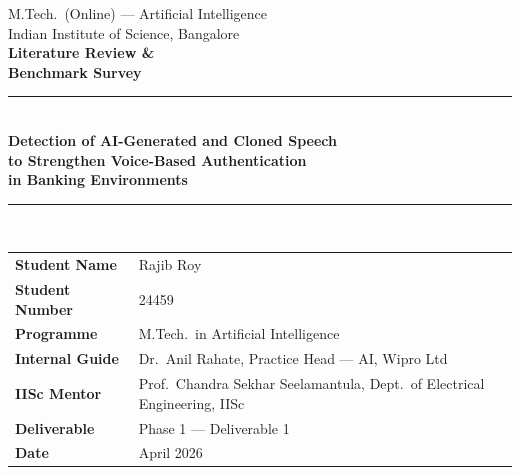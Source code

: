 \documentclass[12pt,a4paper]{article}
\begin{document}

\begin{titlepage}
  \thispagestyle{empty}
  \begin{center}
    \vspace*{1cm}
    {\large\color{darkblue}M.Tech.\ (Online) --- Artificial Intelligence}\\[4pt]
    {\large\color{darkblue}Indian Institute of Science, Bangalore}\\[2.5cm]
    {\Huge\bfseries\color{darkblue}Literature Review \&}\\[6pt]
    {\Huge\bfseries\color{darkblue}Benchmark Survey}\\[1.2cm]
    {\color{medblue}\rule{\linewidth}{2pt}}\\[0.6cm]
    {\LARGE\bfseries\color{medblue}
      Detection of AI-Generated and Cloned Speech\\[6pt]
      to Strengthen Voice-Based Authentication\\[6pt]
      in Banking Environments}\\[0.4cm]
    {\color{medblue}\rule{\linewidth}{1pt}}\\[2cm]
    \begin{tabular}{@{}L{4.2cm}L{9cm}@{}}
      \textbf{Student Name}   & Rajib Roy \\
          \textbf{Student Number} & 24459 \\
      \textbf{Programme}      & M.Tech.\ in Artificial Intelligence \\
          \textbf{Internal Guide} & Dr.\ Anil Rahate, Practice Head --- AI, Wipro Ltd \\
      \textbf{IISc Mentor}    & Prof.\ Chandra Sekhar Seelamantula,
                                                     Dept.\ of Electrical Engineering, IISc \\
          \textbf{Deliverable}    & Phase 1 --- Deliverable 1 \\
      \textbf{Date}           & April 2026 \\
    \end{tabular}
  \end{center}
\end{titlepage}

\tableofcontents
\clearpage
{}

\end{document}

